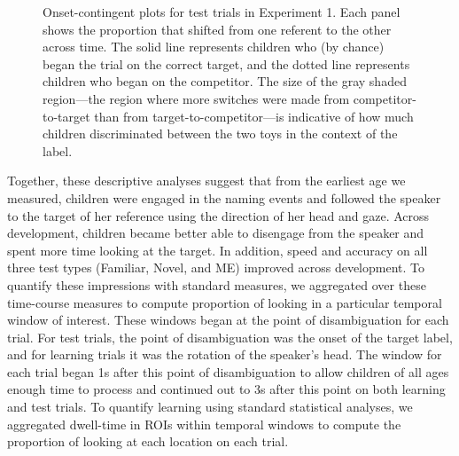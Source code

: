 \documentclass[man,floatsintext]{apa6}
\begin{document}
\begin{figure}[tb]
	\caption{\label{fig:exp1_split} Onset-contingent plots for test trials in Experiment 1. Each panel shows the proportion that shifted from one referent to the other across time. The solid line represents children who (by chance) began the trial on the correct target, and the dotted line represents children who began on the competitor. The size of the gray shaded region---the region where more switches were made from competitor-to-target than from target-to-competitor---is indicative of how much children discriminated between the two toys in the context of the label.}
\end{figure}

Together, these descriptive analyses suggest that from the earliest age we measured, children were engaged in the naming events and followed the speaker to the target of her reference using the direction of her head and gaze. Across development, children became better able to disengage from the speaker and spent more time looking at the target. In addition, speed and accuracy on all three test types (Familiar, Novel, and ME) improved across development. To quantify these impressions with standard measures, we aggregated over these time-course measures to compute proportion of looking in a particular temporal window of interest. These windows began at the point of disambiguation for each trial. For test trials, the point of disambiguation was the onset of the target label, and for learning trials it was the rotation of the speaker's head. The window for each trial began 1s after this point of disambiguation to allow children of all ages enough time to process and continued out to 3s after this point on both learning and test trials. To quantify learning using standard statistical analyses, we aggregated dwell-time in ROIs within temporal windows to compute the proportion of looking at each location on each trial.
\end{document}
